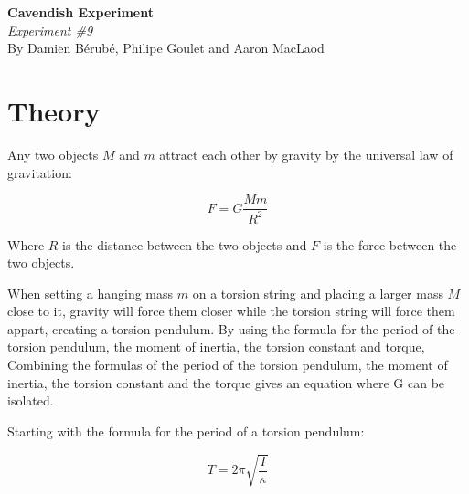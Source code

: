 \documentclass[12pt]{article}
\begin{document}
\begin{center}
    \large\textbf{Cavendish Experiment}\\
\normalsize \textit{Experiment \#9}\\
    By Damien Bérubé, Philipe Goulet and Aaron MacLaod
\end{center}
 \section*{Theory}

    Any two objects $M$ and $m$ attract each other by gravity by the universal law of gravitation:

    \begin{equation}
        F=G\frac{Mm}{R^2}
    \end{equation}

    Where $R$ is the distance between the two objects and $F$ is the force between the two objects.

    When setting a hanging mass $m$ on a torsion string and placing a larger mass $M$ close to it, gravity will force them closer while the torsion string will force them appart, creating a torsion pendulum. By using the formula for the period of the torsion pendulum, the moment of inertia, the torsion constant and torque, Combining the formulas of the period of the torsion pendulum, the moment of inertia, the torsion constant and the torque gives an equation where G can be isolated.


    Starting with the formula for the period of a torsion pendulum:

    \begin{equation}
        T=2\pi\sqrt{\frac{I}{\kappa}} \label{eq:torsion}
    \end{equation}
\end{document}
